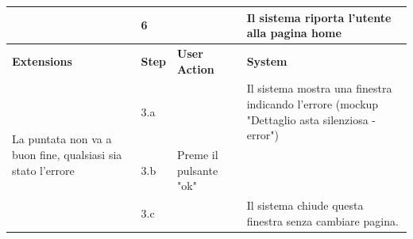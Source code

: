 \begin{table}[H]
\begin{tabularx}{\linewidth}{|p{135pt}|p{25pt}|>{\raggedright\arraybackslash}X|>{\raggedright\arraybackslash}X|}
		\cline{2-4}                                                                      & 6                                                                                                                                                                      &                                                                                  & Il sistema riporta l'utente alla pagina home                                                   \\

		\hline \rowcolor[HTML]{DCDCDC}
		\textbf{\sffamily Extensions}                                                    & \textbf{\sffamily Step}                                                                                                                                                & \textbf{\sffamily User Action}                                                   & \textbf{\sffamily System}                                                                      \\
		\hline
		\multirow{3}{135pt}{La puntata non va a buon fine, qualsiasi sia stato l'errore} & 3.a                                                                                                                                                                    &                                                                                  & Il sistema mostra una finestra indicando l'errore (mockup "Dettaglio asta silenziosa - error") \\
		\cline{2-4}                                                                      & 3.b                                                                                                                                                                    & Preme il pulsante "ok"                                                           &                                                                                                \\
		\cline{2-4}                                                                      & 3.c                                                                                                                                                                    &                                                                                  & Il sistema chiude questa finestra senza cambiare pagina.                                       \\

		\hline
	\end{tabularx}
\end{table}

